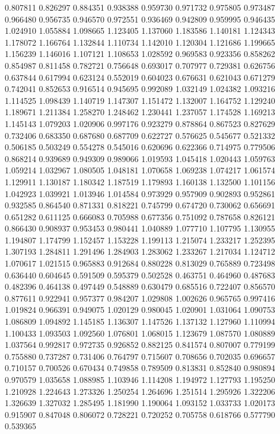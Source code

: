 0.807811
0.826297
0.884351
0.938388
0.959730
0.971732
0.975805
0.973487
0.966480
0.956735
0.946570
0.972551
0.936469
0.942809
0.959995
0.946435
1.024910
1.055884
1.098665
1.123405
1.137060
1.183586
1.140181
1.124343
1.178072
1.166764
1.132844
1.110734
1.142010
1.120304
1.121686
1.199665
1.156239
1.146016
1.107121
1.108653
1.028592
0.969583
0.923356
0.858262
0.854987
0.811458
0.782721
0.756648
0.693017
0.707977
0.729381
0.626756
0.637844
0.617994
0.623124
0.552019
0.604023
0.676631
0.621043
0.671279
0.742041
0.852653
0.916514
0.945695
0.992089
1.032149
1.024382
1.093216
1.114525
1.098439
1.140719
1.147307
1.151472
1.132007
1.164752
1.129240
1.189671
1.211384
1.258270
1.248462
1.230441
1.237057
1.174528
1.169213
1.145143
1.079203
1.020906
0.997176
0.923279
0.878864
0.867523
0.827629
0.732406
0.683350
0.687680
0.687709
0.622727
0.576625
0.545677
0.521332
0.506185
0.503249
0.554278
0.545016
0.620696
0.622366
0.714975
0.779506
0.868214
0.939689
0.949309
0.989066
1.019593
1.045418
1.020443
1.059763
1.059214
1.032967
1.080505
1.048181
1.070658
1.069238
1.074217
1.061574
1.129911
1.130187
1.180342
1.187519
1.179893
1.160138
1.132500
1.101156
1.042923
1.039921
1.013946
1.014584
0.973929
0.957909
0.902893
0.952861
0.932585
0.864540
0.871331
0.818221
0.745799
0.674720
0.730062
0.656691
0.651282
0.611125
0.666083
0.705988
0.677356
0.751092
0.787658
0.826121
0.866430
0.908937
0.953453
0.980441
1.040889
1.077710
1.107795
1.130955
1.194807
1.174799
1.152457
1.153228
1.199113
1.215074
1.233217
1.252395
1.307193
1.284811
1.291496
1.284903
1.283062
1.233267
1.217034
1.124712
1.070617
1.021515
0.965883
0.912684
0.880228
0.813029
0.765889
0.723498
0.636440
0.604645
0.591509
0.595379
0.502528
0.463751
0.464960
0.487683
0.482396
0.464138
0.497449
0.548889
0.630479
0.685516
0.722407
0.856570
0.877611
0.922941
0.957377
0.984207
1.029808
1.002626
0.965765
0.997416
1.019824
0.966391
0.949075
1.020129
0.980045
1.020901
1.031064
1.090753
1.086809
1.094892
1.145185
1.136307
1.147526
1.137132
1.127960
1.110994
1.100433
1.093503
1.092560
1.076801
1.068015
1.123679
1.087570
1.080889
1.037564
0.992817
0.972735
0.926852
0.882125
0.841574
0.807007
0.779199
0.755880
0.737287
0.731406
0.764797
0.715607
0.708656
0.702035
0.696657
0.710157
0.700526
0.670434
0.749858
0.789509
0.813831
0.852840
0.980894
0.970579
1.035658
1.088985
1.103946
1.114208
1.194972
1.127793
1.195250
1.210928
1.224643
1.273326
1.250254
1.264696
1.251514
1.295926
1.322206
1.326639
1.327032
1.285495
1.181990
1.190064
1.093152
1.033733
1.020173
0.915907
0.847048
0.806072
0.728221
0.720252
0.705758
0.618766
0.577790
0.539365
